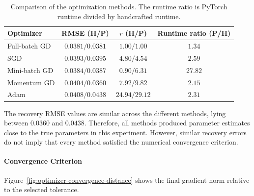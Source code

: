 \documentclass[11pt,a4paper]{article}
\begin{document}
\begin{table}[H]
    \small
    \setlength{\tabcolsep}{5pt}
    \centering
    \caption[Optimizer comparison]{Comparison of the optimization methods. The runtime ratio
    is PyTorch runtime divided by handcrafted runtime.}
    \label{tab:optimizer-comparison}
    \small
    \begin{tabular}{lccc}
        \toprule
        Optimizer
        & RMSE (H/P)
        & \(r\) (H/P)
        & Runtime ratio (P/H) \\
        \midrule
        Full-batch GD
        & \(0.0381/0.0381\)
        & \(1.00/1.00\)
        & \(1.34\) \\

        SGD
        & \(0.0393/0.0395\)
        & \(4.80/4.54\)
        & \(2.59\) \\

        Mini-batch GD
        & \(0.0384/0.0387\)
        & \(0.90/6.31\)
        & \(27.82\) \\

        Momentum GD
        & \(0.0404/0.0360\)
        & \(7.92/9.82\)
        & \(2.15\) \\

        Adam
        & \(0.0408/0.0438\)
        & \(24.94/29.12\)
        & \(2.31\) \\
        \bottomrule
    \end{tabular}
\end{table}

The recovery RMSE values are similar across the different methods,
lying between \(0.0360\) and \(0.0438\). Therefore, all methods produced
parameter estimates close to the true parameters in this experiment.
However, similar recovery errors do not imply that every method
satisfied the numerical convergence criterion.

\paragraph{Convergence Criterion}

Figure~\ref{fig:optimizer-convergence-distance} shows the final
gradient norm relative to the selected tolerance.
\end{document}
